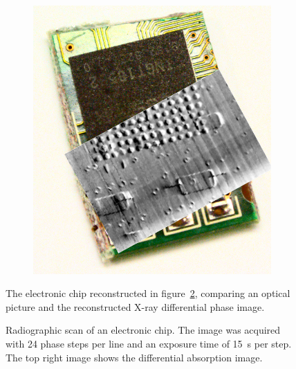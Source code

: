\begin{figure}[htb]
\begin{subfigure}[b]{.49\textwidth}
    \includegraphics[width=\textwidth]{gfx/mythen-edge-on/chip_overlay_full.png}
    \caption{}
    \end{subfigure}
    \caption{The electronic chip reconstructed in figure~\ref{fig:img_chip},
comparing an optical picture and the reconstructed X-ray differential phase
image.}
    \label{fig:chip_photo}
\end{figure}

\begin{figure}[htp]
    \centering
    
    \caption{Radiographic scan of an electronic chip. The image was acquired
        with 24 phase steps per line and an exposure time of \SI{15}{\second} per
    step. The top right image shows the differential absorption image.}\label{fig:img_chip}
\end{figure}

